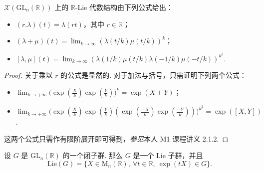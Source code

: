 \begin{proposition}\label{prop:lie-1-6-3}
$\mathscr X(\mathrm{GL}_n(\mathbb R))$ 上的 $\mathbb R$-Lie 代数结构由下列公式给出：
\begin{itemize}[label=--]
\item $(r.\lambda)(t)=\lambda(rt)$，其中 $r\in\mathbb R$；
\item $(\lambda+\mu)(t)=\lim_{k\to\infty}(\lambda(t/k)\mu(t/k))^k$；
\item $[\lambda,\mu](t)=\lim_{k\to\infty}(\lambda(1/k)\mu(t/k)\lambda(-1/k)\mu(-t/k))^{k^2}$.
\end{itemize}
\end{proposition}
\begin{proof}
关于乘以 $r$ 的公式是显然的. 对于加法与括号，只需证明下列两个公式：
\begin{itemize}[label=--]
\item $\lim_{k\to+\infty}\bigl(\exp(\tfrac{X}{k})\exp(\tfrac{Y}{k})\bigr)^{k}=\exp(X+Y)$；
\item $\lim_{k\to+\infty}\bigl(\exp(\tfrac{X}{k})\exp(\tfrac{Y}{k})(\exp(\tfrac{-X}{k})\exp(\tfrac{-Y}{k}))\bigr)^{k^2}=\exp([X,Y])$.
\end{itemize}
这两个公式只需作有限阶展开即可得到，\emph{参见}本人 M1 课程讲义 2.1.2.
\end{proof}
\begin{theorem}\label{thm:lie-1-6-4}
设 $G$ 是 $\mathrm{GL}_n(\mathbb R)$ 的一个闭子群. 那么 $G$ 是一个 Lie 子群，并且
\[
\mathrm{Lie}(G)=\{X\in\mathrm{M}_n(\mathbb R),\ \forall t\in\mathbb R,\ \exp(tX)\in G\}.
\]
\end{theorem}
